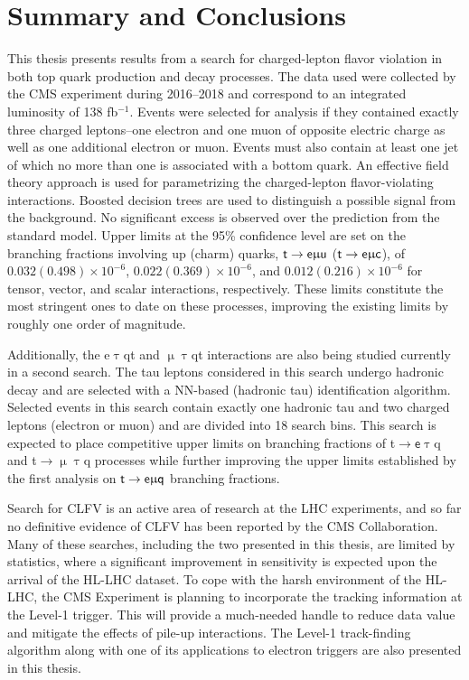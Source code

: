\chapter{Summary and Conclusions}
\label{chap:Conclusion}

This thesis presents results from a search for charged-lepton flavor violation in both top quark production and decay processes. The data used were collected by the \ac{CMS} experiment during 2016--2018 and correspond to an integrated luminosity of 138 fb$^{-1}$. Events were selected for analysis if they contained exactly three charged leptons--one electron and one muon of opposite electric charge as well as one additional electron or muon. Events must also contain at least one jet of which no more than one is associated with a bottom quark. An effective field theory approach is used for parametrizing the charged-lepton flavor-violating interactions. Boosted decision trees are used to distinguish a possible signal from the background. No significant excess is observed over the prediction from the standard model. Upper limits at the 95\% confidence level are set on the branching fractions involving up (charm) quarks, $\textsf{t}\rightarrow\textsf{e}\upmu\textsf{u}$ ($\textsf{t}\rightarrow\textsf{e}\upmu\textsf{c}$), of $0.032 (0.498) \times 10^{-6}$, $0.022 (0.369) \times 10^{-6}$, and $0.012 (0.216) \times 10^{-6}$ for tensor, vector, and scalar interactions, respectively. These limits constitute the most stringent ones to date on these processes, improving the existing limits by roughly one order of magnitude.

Additionally, the e$\uptau$qt and $\upmu\uptau$qt interactions are also being studied currently in a second search. The tau leptons considered in this search undergo hadronic decay and are selected with a \ac{NN}-based (hadronic tau) identification algorithm. Selected events in this search contain exactly one hadronic tau and two charged leptons (electron or muon) and are divided into 18 search bins. This search is expected to place competitive upper limits on branching fractions of t$\rightarrow\textsf{e}\uptau$q and t$\rightarrow\upmu\uptau$q processes while further improving the upper limits established by the first analysis on $\textsf{t}\rightarrow\textsf{e}\upmu\textsf{q}$ branching fractions. 

Search for \ac{CLFV} is an active area of research at the \ac{LHC} experiments, and so far no definitive evidence of \ac{CLFV} has been reported by the \ac{CMS} Collaboration. Many of these searches, including the two presented in this thesis, are limited by statistics, where a significant improvement in sensitivity is expected upon the arrival of the \ac{HL-LHC} dataset. To cope with the harsh environment of the \ac{HL-LHC}, the \ac{CMS} Experiment is planning to incorporate the tracking information at the Level-1 trigger. This will provide a much-needed handle to reduce data value and mitigate the effects of pile-up interactions. The Level-1 track-finding algorithm along with one of its applications to electron triggers are also presented in this thesis.